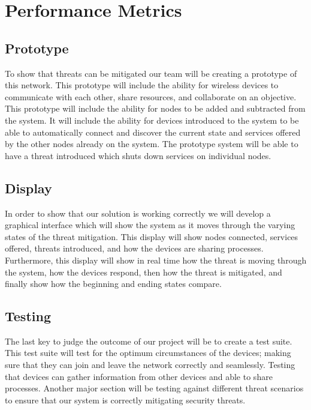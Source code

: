 \documentclass[onecolumn, draftclsnofoot,10pt, compsoc]{IEEEtran}
\begin{document}
\section{Performance Metrics}
\subsection{Prototype}
To show that threats can be mitigated our team will be creating a prototype of this network. This prototype will include the ability for wireless devices to communicate with each other, share resources, and collaborate on an objective. This prototype will include the ability for nodes to be added and subtracted from the system. It will include the ability for devices introduced to the system to be able to automatically connect and discover the current state and services offered by the other nodes already on the system. The prototype system will be able to have a threat introduced which shuts down services on individual nodes. 
\subsection{Display}
In order to show that our solution is working correctly we will develop a graphical interface which will show the system as it moves through the varying states of the threat mitigation. This display will show nodes connected, services offered, threats introduced, and how the devices are sharing processes. Furthermore, this display will show in real time how the threat is moving through the system, how the devices respond, then how the threat is mitigated, and finally show how the beginning and ending states compare.
\subsection{Testing}
The last key to judge the outcome of our project will be to create a test suite. This test suite will test for the optimum circumstances of the devices; making sure that they can join and leave the network correctly and seamlessly. Testing that devices can gather information from other devices and able to share processes. Another major section will be testing against different threat scenarios to ensure that our system is correctly mitigating security threats.  



\vspace{2 in}
\end{document}
